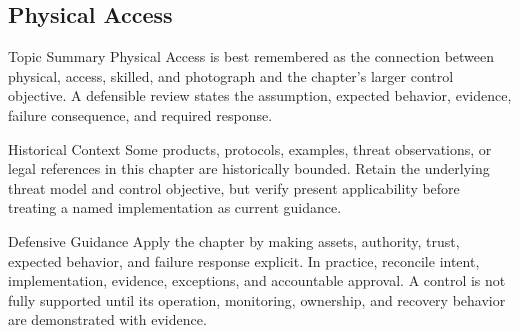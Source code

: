 \documentclass[11pt,letterpaper]{article}
\begin{document}
\subsection*{Physical Access}
\begin{CornellNotesTable}
\end{CornellNotesTable}
\begin{CornellSummaryBox}{Topic Summary}
Physical Access is best remembered as the connection between physical, access, skilled, and photograph and the chapter's larger control objective. A defensible review states the assumption, expected behavior, evidence, failure consequence, and required response.
\end{CornellSummaryBox}
\begin{CornellWarningBox}{Historical Context}
Some products, protocols, examples, threat observations, or legal references in this chapter are historically bounded. Retain the underlying threat model and control objective, but verify present applicability before treating a named implementation as current guidance.
\end{CornellWarningBox}
\begin{CornellOverviewBox}{Defensive Guidance}
Apply the chapter by making assets, authority, trust, expected behavior, and failure response explicit. In practice, reconcile intent, implementation, evidence, exceptions, and accountable approval. A control is not fully supported until its operation, monitoring, ownership, and recovery behavior are demonstrated with evidence.
\end{CornellOverviewBox}
\end{document}
